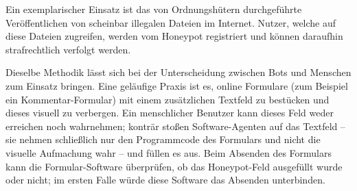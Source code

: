 Ein exemplarischer Einsatz ist das von Ordnungshütern durchgeführte
Veröffentlichen von scheinbar illegalen Dateien im Internet. Nutzer, welche auf
diese Dateien zugreifen, werden vom Honeypot registriert und können daraufhin
strafrechtlich verfolgt werden.

Dieselbe Methodik lässt sich bei der Unterscheidung zwischen Bots und Menschen
zum Einsatz bringen. Eine geläufige Praxis ist es, online Formulare (zum
Beispiel ein Kommentar-Formular) mit einem zusätzlichen Textfeld zu bestücken
und dieses visuell zu verbergen. Ein menschlicher Benutzer kann dieses Feld
weder erreichen noch wahrnehmen; konträr stoßen Software-Agenten auf das
Textfeld – sie nehmen schließlich nur den Programmcode des Formulars und nicht
die visuelle Aufmachung wahr – und füllen es aus. Beim Absenden des Formulars
kann die Formular-Software überprüfen, ob das Honeypot-Feld ausgefüllt wurde
oder nicht; im ersten Falle würde diese Software das Absenden unterbinden.
